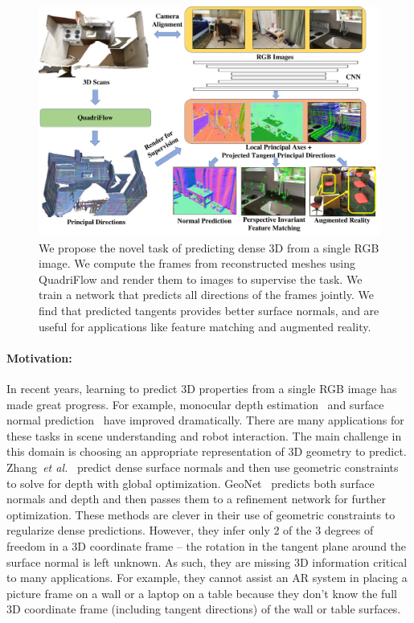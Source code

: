  \begin{figure}
    \centering
    \includegraphics[width=0.75\linewidth]{FrameNet/graph/teaser.pdf}
    \caption{We propose the novel task of predicting dense 3D \cframe{} from a single RGB image. We compute the frames from reconstructed meshes using QuadriFlow and render them to images to supervise the task.  We train a network that predicts all directions of the frames jointly.  We find that predicted tangents provides better surface normals, and are useful for applications like feature matching and augmented reality.}
    \label{fig:framenet-teaser}
    \vspace{-0.1in}
\end{figure}

\paragraph*{Motivation:} In recent years, learning to predict 3D properties from a single RGB image has made great progress.  For example, monocular depth estimation~\cite{shelhamer2015scene,li2017two,xu2017multi,wang2018adaptive,fu2018deep} and surface normal prediction~\cite{eigen2015predicting,wang2015designing,bansal2016marr,qi2018geonet} have improved dramatically.  There are many applications for these tasks in scene understanding and robot interaction. 
%
The main challenge in this domain is choosing an appropriate representation of 3D geometry to predict.  Zhang~\textit{et al.}~\cite{zhang2018deep} predict dense surface normals and then use geometric constraints to solve for depth with global optimization.  GeoNet~\cite{qi2018geonet} predicts both surface normals and depth and then passes them to a refinement network for further optimization.  These methods are clever in their use of geometric constraints to regularize dense predictions.   However, they infer only 2 of the 3 degrees of freedom in a 3D coordinate frame -- the rotation in the tangent plane around the surface normal is left unknown.  As such, they are missing 3D information critical to many applications.  For example, they cannot assist an AR system in placing a picture frame on a wall or a laptop on a table because they don't know the full 3D coordinate frame (including tangent directions) of the wall or table surfaces.

